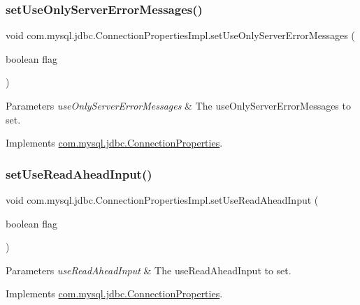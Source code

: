 \subsubsection{\texorpdfstring{set\+Use\+Only\+Server\+Error\+Messages()}{setUseOnlyServerErrorMessages()}}
{\footnotesize\ttfamily void com.\+mysql.\+jdbc.\+Connection\+Properties\+Impl.\+set\+Use\+Only\+Server\+Error\+Messages (\begin{DoxyParamCaption}\item[{boolean}]{flag }\end{DoxyParamCaption})}


\begin{DoxyParams}{Parameters}
{\em use\+Only\+Server\+Error\+Messages} & The use\+Only\+Server\+Error\+Messages to set. \\
\hline
\end{DoxyParams}


Implements \mbox{\hyperlink{interfacecom_1_1mysql_1_1jdbc_1_1_connection_properties_a4d6983e3fcbf208b481c59edb1aa793b}{com.\+mysql.\+jdbc.\+Connection\+Properties}}.

\mbox{\label{classcom_1_1mysql_1_1jdbc_1_1_connection_properties_impl_a8abdec8506338f240bf554813798915d}} 
\subsubsection{\texorpdfstring{set\+Use\+Read\+Ahead\+Input()}{setUseReadAheadInput()}}
{\footnotesize\ttfamily void com.\+mysql.\+jdbc.\+Connection\+Properties\+Impl.\+set\+Use\+Read\+Ahead\+Input (\begin{DoxyParamCaption}\item[{boolean}]{flag }\end{DoxyParamCaption})}


\begin{DoxyParams}{Parameters}
{\em use\+Read\+Ahead\+Input} & The use\+Read\+Ahead\+Input to set. \\
\hline
\end{DoxyParams}


Implements \mbox{\hyperlink{interfacecom_1_1mysql_1_1jdbc_1_1_connection_properties_a4c83918a441a7c5938d0ec80a975b92b}{com.\+mysql.\+jdbc.\+Connection\+Properties}}.

